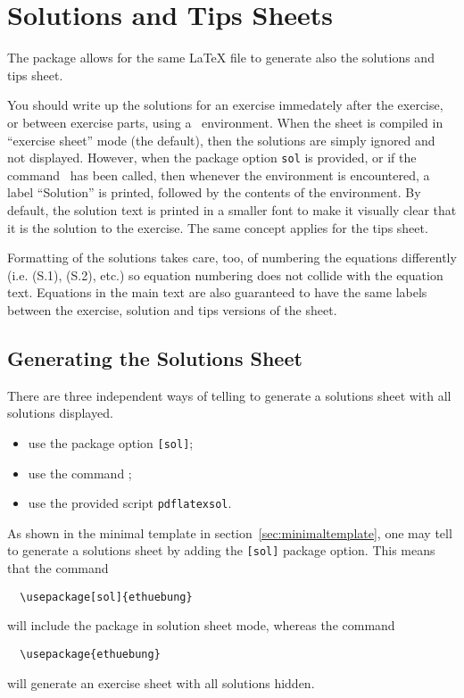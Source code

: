 \documentclass[11pt,a4paper]{article}
\begin{document}
\section{Solutions and Tips Sheets}
\label{sec:Solutions}

The package \ethuebung{} allows for the same \LaTeX{} file to generate also the solutions
and tips sheet.

You should write up the solutions for an exercise immedately after the exercise, or
between exercise parts, using a~ environment. When the sheet is compiled
in ``exercise sheet'' mode (the default), then the solutions are simply ignored and not
displayed. However, when the package option {\tt sol} is provided, or if the
command~ has been called, then whenever the environment
 is encountered, a label ``Solution'' is printed, followed by the
contents of the environment. By default, the solution text is printed in a smaller font to
make it visually clear that it is the solution to the exercise. The same concept applies
for the tips sheet.

Formatting of the solutions takes care, too, of numbering the equations differently
(i.e. (S.1), (S.2), etc.) so equation numbering does not collide with the equation
text. Equations in the main text are also guaranteed to have the same
labels between the exercise, solution and tips versions of the sheet.


\subsection{Generating the Solutions Sheet}
\label{sec:generateSolutions}

There are three independent ways of telling \ethuebung{} to generate a solutions sheet
with all solutions displayed.
\begin{itemize}
\item use the package option \texttt{[sol]};
\item use the command ;
\item use the provided script \texttt{pdflatexsol}.
\end{itemize}

As shown in the minimal template in section~\ref{sec:minimaltemplate}, one may tell
\ethuebung{} to generate a solutions sheet by adding the \texttt{[sol]} package
option. This means that the command
{\setlength\pkgverbatimoutsidespacing{-3mm}
\begin{pkgverbatim}[-6mm]
\begin{verbatim}
  \usepackage[sol]{ethuebung}
\end{verbatim}
\end{pkgverbatim}}
will include the \ethuebung{} package in solution sheet mode, whereas the command
{\setlength\pkgverbatimoutsidespacing{-3mm}
\begin{pkgverbatim}[-6mm]
\begin{verbatim}
  \usepackage{ethuebung}
\end{verbatim}
\end{pkgverbatim}}
will generate an exercise sheet with all solutions hidden.
\end{document}
